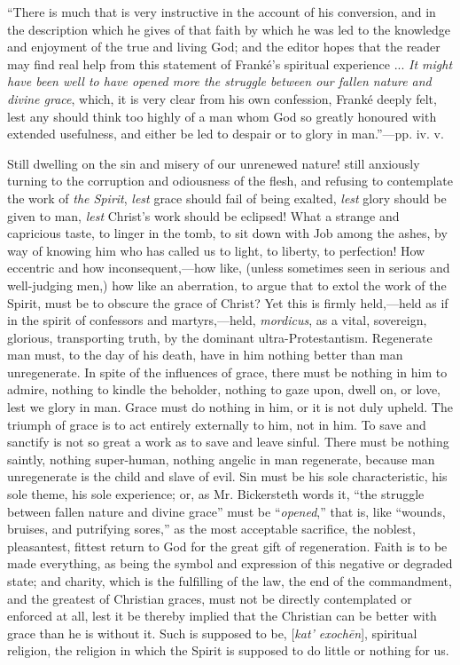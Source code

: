 ``There is much that is very
instructive in the account of his conversion, and in the description
which he gives of that faith by which he was led to the knowledge and
enjoyment of the true and living God; and the editor hopes that the
reader may find real help from this statement of Franké's spiritual
experience ... \emph{It might have been well to have opened more the
struggle between our fallen nature and divine grace}, which, it is
very clear from his own confession, Franké deeply felt, lest any should
think too highly of a man whom God so greatly honoured with extended
usefulness, and either be led to despair or to glory in man.''—pp. iv.
v.

Still dwelling on the sin and misery of our
unrenewed nature! still anxiously turning to the corruption and
odiousness of the flesh, and refusing to contemplate the work of \emph{the
Spirit}, \emph{lest} grace should fail of being exalted, \emph{lest}
glory should be given to man, \emph{lest} Christ's work should be
eclipsed! What a strange and capricious taste, to linger in the tomb, to
sit down with Job among the ashes, by way of knowing him who has called
us to light, to liberty, to perfection! How eccentric and how
inconsequent,—how like, (unless sometimes seen in serious and
well-judging men,) how like an aberration, to argue that to extol the
work of the Spirit, must be to obscure the grace of Christ? Yet this is
firmly held,—held as if in the spirit of confessors and
martyrs,—held, \emph{mordicus}, as a vital, sovereign, glorious,
transporting truth, by the dominant ultra-Protestantism. Regenerate man
must, to the day of his death, have in him nothing better than man
unregenerate. In spite of the influences of grace, there must be nothing
in him to admire, nothing to kindle the beholder, nothing to gaze upon,
dwell on, or love, lest we glory in man. Grace must do nothing in him,
or it is not duly upheld. The triumph of grace is to act entirely
externally to him, not in him. To save and sanctify is not so great a
work as to save and leave sinful. There must be nothing saintly, nothing
super-human, nothing angelic in man regenerate, because man unregenerate
is the child and slave of evil. Sin must be his sole characteristic, his
sole theme, his sole experience; or, as Mr. Bickersteth words it, ``the
struggle between fallen nature and divine grace'' must be ``\emph{opened},''
that is, like ``wounds, bruises, and putrifying sores,'' as the most
acceptable sacrifice, the noblest, pleasantest, fittest return to God
for the great gift of regeneration. Faith is to be made everything, as
being the symbol and expression of this negative or degraded
state; and charity, which is the fulfilling of the law, the end of the
commandment, and the greatest of Christian graces, must not be directly
contemplated or enforced at all, lest it be thereby implied that the
Christian can be better with grace than he is without it. Such is
supposed to be, [\emph{kat' exoch\={e}n}], spiritual religion, the
religion in which the Spirit is supposed to do little or nothing for us.

